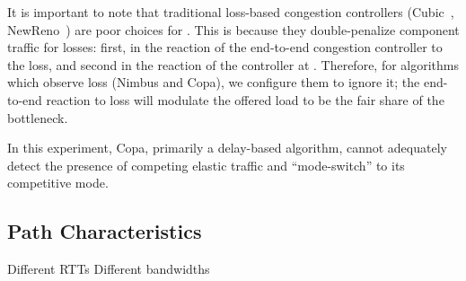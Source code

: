 It is important to note that traditional loss-based congestion controllers (\ie Cubic~\cite{cubic}, NewReno~\cite{reno}) are poor choices for \name. 
This is because they double-penalize component traffic for losses: first, in the reaction of the end-to-end congestion controller to the loss, and second in the reaction of the controller at \name.
Therefore, for algorithms which observe loss (Nimbus and Copa), we configure them to ignore it; the end-to-end reaction to loss will modulate the offered load to be the fair share of the bottleneck.

In this experiment, Copa, primarily a delay-based algorithm, cannot adequately detect the presence of competing elastic traffic and ``mode-switch'' to its competitive mode. 

\subsection{Path Characteristics}\label{s:robust:path}
\begin{outline}
\1 Different RTTs
\1 Different bandwidths
\end{outline}
